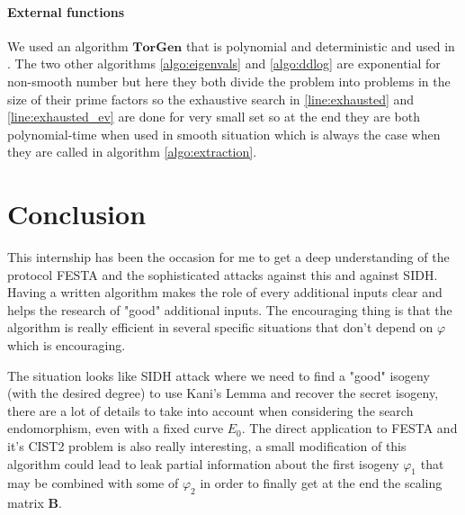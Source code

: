 \documentclass[12pt,a4paper]{article}
\begin{document}
				\paragraph{External functions} We used an algorithm $\mathbf{TorGen}$ that is polynomial and
				deterministic and used in \cite{FESTA}. The two other algorithms \ref{algo:eigenvals} and
				\ref{algo:ddlog} are exponential for non-smooth number but here they both divide the problem into
				problems in the size of their prime factors so the exhaustive search in \ref{line:exhausted} and
				\ref{line:exhausted_ev} are done for very small set so at the end they are both polynomial-time
				when used in smooth situation which is always the case when they are called in algorithm 
				\ref{algo:extraction}.

				\section{Conclusion}


				This internship has been the occasion for me to get a deep understanding of the protocol FESTA
				and the 
				sophisticated attacks against this and against SIDH. Having a written algorithm makes the role of
				every additional inputs clear and helps the research of "good" additional inputs.
				The encouraging thing is that the algorithm is really efficient in several specific situations
				that don't depend on $\varphi$ which is encouraging.
				
				The situation looks like SIDH attack where we need to find a "good" isogeny (with the desired
				degree) to use Kani's Lemma and recover the secret isogeny, there are a lot of details to take
				into account when considering the search endomorphism, even with a fixed curve $E_0$.
				The direct application to FESTA and it's CIST2 problem is also really interesting, a small
				modification of this algorithm could lead to leak partial information about the first isogeny
				$\varphi_1$ that may be combined with some of $\varphi_2$ in order to finally get at the end
				the scaling matrix $\mathbf B$.
				
				
				
\end{document}
